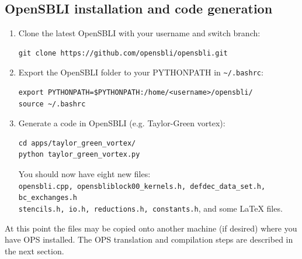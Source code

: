 \documentclass[11pt]{article}
\begin{document}
\subsection{OpenSBLI installation and code generation}
\begin{enumerate}
\item{Clone the latest OpenSBLI with your username and switch branch:}
\begin{verbatim}
git clone https://github.com/opensbli/opensbli.git
\end{verbatim}

\item{Export the OpenSBLI folder to your PYTHONPATH in \verb|~/.bashrc|:}
\begin{verbatim}
export PYTHONPATH=$PYTHONPATH:/home/<username>/opensbli/
source ~/.bashrc
\end{verbatim}

\item{Generate a code in OpenSBLI (e.g. Taylor-Green vortex):}
\begin{verbatim}
cd apps/taylor_green_vortex/
python taylor_green_vortex.py
\end{verbatim}
You should now have eight new files:\\ \verb|opensbli.cpp, opensbliblock00_kernels.h, defdec_data_set.h, bc_exchanges.h|\\
\verb|stencils.h, io.h, reductions.h, constants.h|, and some LaTeX files.
\end{enumerate}
At this point the files may be copied onto another machine (if desired) where you have OPS installed. The OPS translation and compilation steps are described in the next section.
\end{document}
